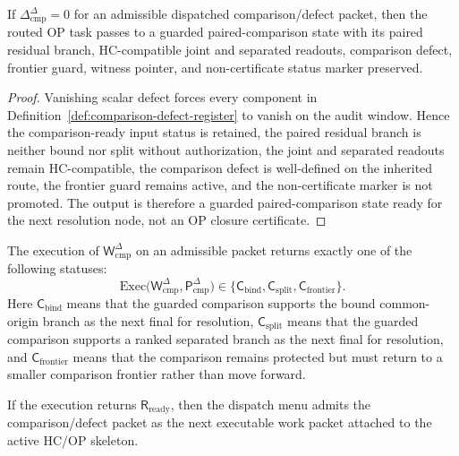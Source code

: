 \begin{lemma}
\label{lem:zero-comparison-defect-preserves-paired-comparison-data}
If \(\Delta_{\mathrm{cmp}}^{\Delta}=0\) for an admissible dispatched comparison/defect packet, then the routed OP task passes to a guarded paired-comparison state with its paired residual branch, HC-compatible joint and separated readouts, comparison defect, frontier guard, witness pointer, and non-certificate status marker preserved.
\end{lemma}

\begin{proof}
Vanishing scalar defect forces every component in Definition~\ref{def:comparison-defect-register} to vanish on the audit window. Hence the comparison-ready input status is retained, the paired residual branch is neither bound nor split without authorization, the joint and separated readouts remain HC-compatible, the comparison defect is well-defined on the inherited route, the frontier guard remains active, and the non-certificate marker is not promoted. The output is therefore a guarded paired-comparison state ready for the next resolution node, not an OP closure certificate.
\end{proof}

\begin{definition}
\label{def:r20-comparison-defect-return}
The execution of \(\mathsf W_{\mathrm{cmp}}^{\Delta}\) on an admissible packet returns exactly one of the following statuses:
\[
\mathrm{Exec}\bigl(\mathsf W_{\mathrm{cmp}}^{\Delta},
 \mathsf P_{\mathrm{cmp}}^{\Delta}\bigr)
\in
\{\mathsf C_{\mathrm{bind}},\mathsf C_{\mathrm{split}},\mathsf C_{\mathrm{frontier}}\}.
\]
Here \(\mathsf C_{\mathrm{bind}}\) means that the guarded comparison supports the bound common-origin branch as the next final for resolution, \(\mathsf C_{\mathrm{split}}\) means that the guarded comparison supports a ranked separated branch as the next final for resolution, and \(\mathsf C_{\mathrm{frontier}}\) means that the comparison remains protected but must return to a smaller comparison frontier rather than move forward.
\end{definition}

\begin{proposition}
\label{prop:dispatched-comparison-defect-packet-admissible}
If the execution returns \(\mathsf R_{\mathrm{ready}}\), then the dispatch menu admits the comparison/defect packet as the next executable work packet attached to the active HC/OP skeleton.
\end{proposition}

